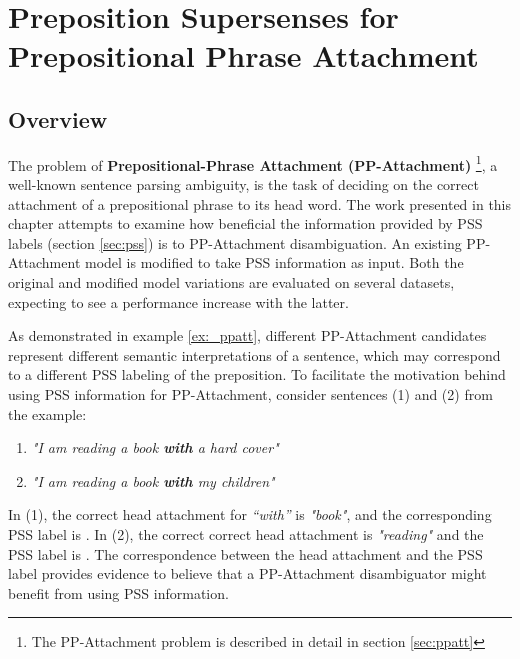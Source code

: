 
\chapter{Preposition Supersenses for  Prepositional Phrase Attachment} %

\label{Chapter3} %


\section{Overview}

The problem of \textbf{Prepositional-Phrase Attachment (PP-Attachment)} \footnote{The PP-Attachment problem is described in detail in section \ref{sec:ppatt}}, a well-known sentence parsing ambiguity, is the task of deciding on the correct attachment of a prepositional phrase to its head word. The work presented in this chapter attempts to examine how beneficial the information provided by PSS labels (section \ref{sec:pss}) is to PP-Attachment disambiguation. An existing PP-Attachment model is modified to take PSS information as input. Both the original and modified model variations are evaluated on several datasets, expecting to see a performance increase with the latter. 

As demonstrated in example \ref{ex:_ppatt}, different PP-Attachment candidates represent different semantic interpretations of a sentence, which may correspond to a different PSS labeling of the preposition. To facilitate the motivation behind using PSS information for PP-Attachment, consider sentences (1) and (2) from the example:

\begin{enumerate} \label{ex:_ppatt}
    \item[1.] \emph{"I am reading a book \textbf{with} a hard cover"}
    \item[2.] \emph{"I am reading a book \textbf{with} my children"}
\end{enumerate}

In (1), the correct head attachment for \textit{“with”} is \textit{"book"}, and the corresponding PSS label is . In (2), the correct correct head attachment is \textit{"reading"} and the PSS label is . The correspondence between the head attachment and the PSS label provides evidence to believe that a PP-Attachment disambiguator might benefit from using PSS information. 

